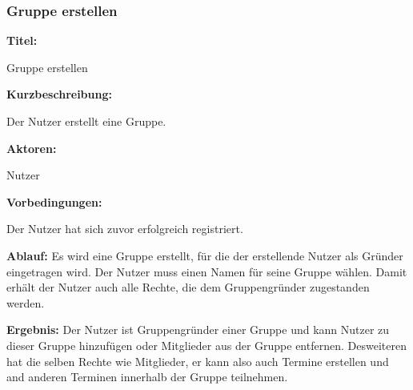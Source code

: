 \documentclass{scrartcl}
\begin{document}
	\newpage
	
	\subsubsection{Gruppe erstellen}
	\begin{description}
		\item \textbf{Titel:}
		\begin{description}
			\item Gruppe erstellen
		\end{description}
		\item \textbf{Kurzbeschreibung:}
		\begin{description}
			\item Der Nutzer erstellt eine Gruppe.
		\end{description}
		\item \textbf{Aktoren:}
		\begin{description}
			\item Nutzer 
		\end{description}
		\item \textbf{Vorbedingungen:}
		\begin{description}
			\item Der Nutzer hat sich zuvor erfolgreich registriert.
		\end{description}
		\item \textbf{Ablauf:} \newline Es wird eine Gruppe erstellt, für die der erstellende Nutzer als Gründer eingetragen wird. Der Nutzer muss einen Namen für seine Gruppe wählen. Damit erhält der Nutzer auch alle Rechte, die dem Gruppengründer zugestanden werden. 
		\item \textbf{Ergebnis:} \newline Der Nutzer ist Gruppengründer einer Gruppe und kann Nutzer zu dieser Gruppe hinzufügen oder Mitglieder aus der Gruppe entfernen. Desweiteren hat die selben Rechte wie Mitglieder, er kann also auch Termine erstellen und and anderen Terminen innerhalb der Gruppe teilnehmen.
	\end{description}
	
	\newpage
	
\end{document}
